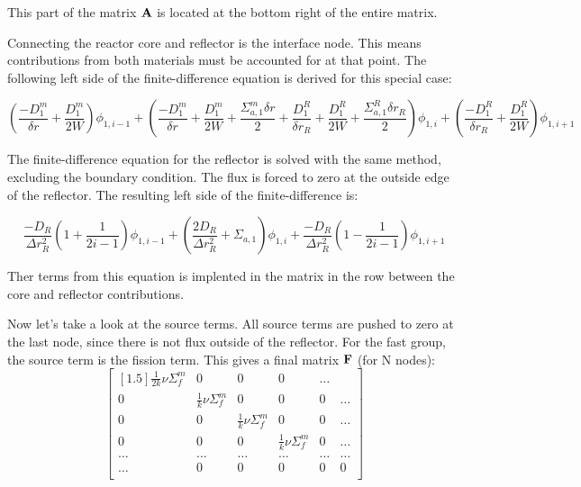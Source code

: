 \documentclass[../main.tex]{subfiles}
\begin{document}
This part of the matrix $\mathbf{A}$ is located at the bottom right of the entire matrix.

	
Connecting the reactor core and reflector is the interface node.  This means contributions from both materials must be accounted for at that point.  The following left side of the finite-difference equation is derived for this special case:

	\begin{equation}
	\left( \frac{-D^m_1}{\delta r} + \frac{D^m_1}{2W} \right) \phi_{1,i-1} + \left( \frac{-D^m_1}{\delta r} + \frac{D^m_1}{2W} + \frac{\Sigma^m_{a,1} \delta r}{2} + \frac{D^R_1}{\delta r_R} + \frac{D^R_1}{2W} + \frac{\Sigma^R_{a,1} \delta r_R}{2} \right) \phi_{1,i} + \left( \frac{-D^R_1}{\delta r_R} + \frac{D^R_1}{2W} \right) \phi_{1,i+1}
	\end{equation}
	
The finite-difference equation for the reflector is solved with the same method, excluding the boundary condition.  The flux is forced to zero at the outside edge of the reflector.  The resulting left side of the finite-difference is:

	\begin{equation}
	\frac{-D_R}{\Delta r_R^2} \left( 1 + \frac{1}{2i-1} \right) \phi_{1,i-1} + \left( \frac{2D_R}{\Delta r_R^2} + \Sigma_{a,1} \right) \phi_{1,i} + \frac{-D_R}{\Delta r_R^2} \left( 1 - \frac{1}{2i-1} \right) \phi_{1,i+1}
	\end{equation}
	
Ther terms from this equation is implented in the matrix in the row between the core and reflector contributions.

Now let's take a look at the source terms.  All source terms are pushed to zero at the last node, since there is not flux outside of the reflector.  For the fast group, the source term  is the fission term.  This gives a final matrix $\mathbf{F}$ (for N nodes):
	\[
	\begin{bmatrix}[1.5]
		\frac{1}{2k} \nu \Sigma^m_f  & 0 & 0 & 0 & \dots\\
		0 & \frac{1}{k} \nu \Sigma^m_f  & 0 & 0 & 0 & \dots \\
		0 & 0 & \frac{1}{k} \nu \Sigma^m_f  & 0 & 0 & \dots\\
		0 & 0 & 0 & \frac{1}{k} \nu \Sigma^m_f  & 0 & \dots \\
		\dots & \dots & \dots & \dots & \dots & \dots \\
		\dots & 0 & 0 & 0 & 0 & 0 \\
	\end{bmatrix}
	\]
	
\end{document}
